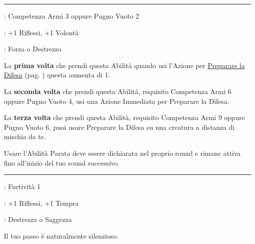 \begin{multicols}{2}
\smallskip\noindent\rule{\linewidth}{2pt} \hypertarget{Parata}{}\medskip{}
\noindent
\begin{description}[noitemsep, topsep=0pt, parsep=0pt, partopsep=0pt, leftmargin=0cm, labelwidth=2.5cm]
    \item[\textbf{Requisito}]: Competenza Armi 3 oppure Pugno Vuoto 2
    \item[\textbf{Tiri Salvezza}]: +1 Riflessi, +1 Volontà
    \item[\textbf{Caratteristica}]: Forza o Destrezza
\end{description}

La \textbf{prima volta} che prendi questa Abilità quando usi l'Azione per \hyperlink{preparareladifesa}{Preparare la Difesa} (pag. \pageref{preparareladifesa}) questa aumenta di 1.

La \textbf{seconda volta} che prendi questa Abilità, requisito Competenza Armi 6 oppure Pugno Vuoto 4, usi una Azione Immediata per Preparare la Difesa.

La \textbf{terza volta} che prendi questa Abilità, requisito Competenza Armi 9 oppure Pugno Vuoto 6, puoi usare Preparare la Difesa su una creatura a distanza di mischia da te.

Usare l'Abilità Parata deve essere dichiarata nel proprio round e rimane attiva fino all'inizio del tuo round successivo.


%

\smallskip\noindent\rule{\linewidth}{2pt} \hypertarget{Passo Felpato}{}\medskip{}
\noindent
\begin{description}[noitemsep, topsep=0pt, parsep=0pt, partopsep=0pt, leftmargin=0cm, labelwidth=2.5cm]
    \item[\textbf{Requisito}]: Furtività 1
    \item[\textbf{Tiri Salvezza}]: +1 Riflessi, +1 Tempra
    \item[\textbf{Caratteristica}]: Destrezza o Saggezza
\end{description}

Il tuo passo è naturalmente silenzioso.


\end{multicols}
